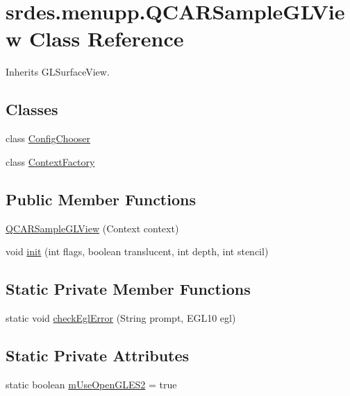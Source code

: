 \hypertarget{classsrdes_1_1menupp_1_1_q_c_a_r_sample_g_l_view}{\section{srdes.\-menupp.\-Q\-C\-A\-R\-Sample\-G\-L\-View \-Class \-Reference}
\label{classsrdes_1_1menupp_1_1_q_c_a_r_sample_g_l_view}
}


\-Inherits \-G\-L\-Surface\-View.

\subsection*{\-Classes}
\begin{DoxyCompactItemize}
\item 
class \hyperlink{classsrdes_1_1menupp_1_1_q_c_a_r_sample_g_l_view_1_1_config_chooser}{\-Config\-Chooser}
\item 
class \hyperlink{classsrdes_1_1menupp_1_1_q_c_a_r_sample_g_l_view_1_1_context_factory}{\-Context\-Factory}
\end{DoxyCompactItemize}
\subsection*{\-Public \-Member \-Functions}
\begin{DoxyCompactItemize}
\item 
\hyperlink{classsrdes_1_1menupp_1_1_q_c_a_r_sample_g_l_view_a5ff97f803e91d0e8d393ebb498c8e0f4}{\-Q\-C\-A\-R\-Sample\-G\-L\-View} (\-Context context)
\item 
void \hyperlink{classsrdes_1_1menupp_1_1_q_c_a_r_sample_g_l_view_a82354d82519ecfd9f2c020b817318904}{init} (int flags, boolean translucent, int depth, int stencil)
\end{DoxyCompactItemize}
\subsection*{\-Static \-Private \-Member \-Functions}
\begin{DoxyCompactItemize}
\item 
static void \hyperlink{classsrdes_1_1menupp_1_1_q_c_a_r_sample_g_l_view_aa2b5e94a873173b2a2256e94e1711f39}{check\-Egl\-Error} (\-String prompt, \-E\-G\-L10 egl)
\end{DoxyCompactItemize}
\subsection*{\-Static \-Private \-Attributes}
\begin{DoxyCompactItemize}
\item 
static boolean \hyperlink{classsrdes_1_1menupp_1_1_q_c_a_r_sample_g_l_view_acc6eb07cc52fc3f8be4ed9d192dabce6}{m\-Use\-Open\-G\-L\-E\-S2} = true
\end{DoxyCompactItemize}


